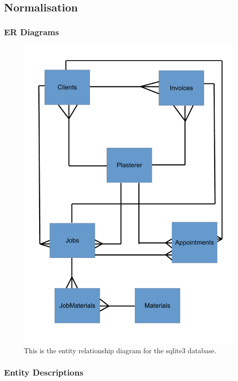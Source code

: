 \subsection{Normalisation}

\subsubsection{ER Diagrams}

\begin{figure}[H]
    \includegraphics[scale=0.4]{./Design/images/ERDiagram.pdf}
    \caption{This is the entity relationship diagram for the sqlite3 database.} \label{fig:Entity_Relationship_Diagram}
\end{figure}


\pagebreak
\subsubsection{Entity Descriptions}

